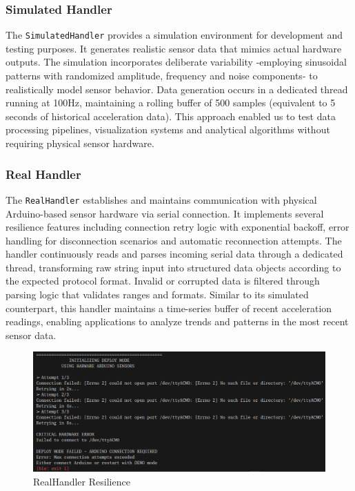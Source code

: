 \documentclass{article}
\begin{document}
    \subsubsection{Simulated Handler}
    The \texttt{SimulatedHandler} provides a simulation environment for development and testing purposes. It generates realistic sensor data that mimics actual hardware outputs. The simulation incorporates deliberate variability -employing sinusoidal patterns with randomized amplitude, frequency and noise components- to realistically model sensor behavior. Data generation occurs in a dedicated thread running at 100Hz, maintaining a rolling buffer of 500 samples (equivalent to 5 seconds of historical acceleration data). This approach enabled us to test data processing pipelines, visualization systems and analytical algorithms without requiring physical sensor hardware.
    
    \subsubsection{Real Handler}
    The \texttt{RealHandler} establishes and maintains communication with physical Arduino-based sensor hardware via serial connection. It implements several resilience features including connection retry logic with exponential backoff, error handling for disconnection scenarios and automatic reconnection attempts. The handler continuously reads and parses incoming serial data through a dedicated thread, transforming raw string input into structured data objects according to the expected protocol format. Invalid or corrupted data is filtered through parsing logic that validates ranges and formats. Similar to its simulated counterpart, this handler maintains a time-series buffer of recent acceleration readings, enabling applications to analyze trends and patterns in the most recent sensor data.
    
    \begin{figure} [h]
        \centering
        \includegraphics[width=0.75\linewidth]{assets/RealHandler.png}
        \caption{RealHandler Resilience}
        \label{fig:enter-label}
    \end{figure}
\end{document}

